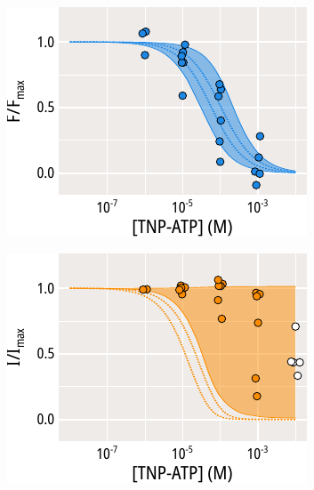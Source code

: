 \begin{figure}[h]
	\centering
	\begin{subfigure}[t]{0.45\textwidth}
		\caption{}\label{ch5fig:c166s_mwc_fit_1}
		\centering
		\includegraphics[width=\textwidth]{mwc_c166s_1.pdf}
	\end{subfigure}
	\hfill
	\begin{subfigure}[t]{0.45\textwidth}
		\caption{}\label{ch5fig:c166s_mwc_fit_2}
		\centering
		\includegraphics[width=\textwidth]{mwc_c166s_3.pdf}
	\end{subfigure}
	\vfill
	\begin{subfigure}[t]{0.9\textwidth}
		\caption{}\label{ch5fig:c166s_mwc_params_1}
		\centering

\end{subfigure}
\end{figure}
